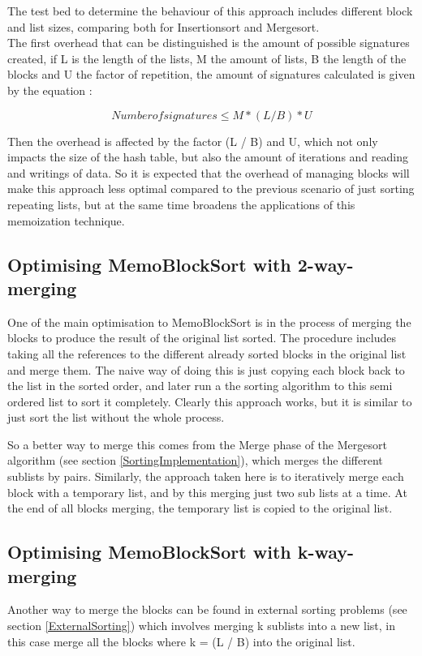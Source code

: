 \documentclass[a4paper,12pt]{article}
\begin{document}
The test bed to determine the behaviour of this approach includes different block and list sizes, comparing both for Insertionsort and Mergesort. \\

The first overhead that can be distinguished is the amount of possible signatures created, if L is the length of the lists, M the amount of lists, B the length of the blocks and U the factor of repetition, the amount of signatures calculated is given by the equation :

\begin{equation}
Number of signatures \leq  M * (L / B) * U
\end{equation}

Then the overhead is affected by the factor (L / B) and U, which not only impacts the size of the hash table, but also the amount of iterations and reading and writings of data. So it is expected that the overhead of managing blocks will make this approach less optimal compared to the previous scenario of just sorting repeating lists, but at the same time broadens the applications of this memoization technique.

\subsection{Optimising MemoBlockSort with 2-way-merging}
One of the main optimisation to MemoBlockSort is in the process of merging the blocks to produce the result of the original list sorted. The procedure includes taking all the references to the different already sorted blocks in the original list and merge them. The naive way of doing this is just copying each block back to the list in the sorted order, and later run a the sorting algorithm to this semi ordered list to sort it completely. Clearly this approach works, but it is similar to just sort the list without the whole process.

So a better way to merge this comes from the Merge phase of the Mergesort algorithm (see section \ref{SortingImplementation}), which merges the different sublists by pairs. Similarly, the approach taken here is to iteratively merge each block with a temporary list, and by this merging just two sub lists at a time. At the end of all blocks merging, the temporary list is copied to the original list.

\subsection{Optimising MemoBlockSort with k-way-merging}
Another way to merge the blocks can be found in external sorting problems (see section \ref{ExternalSorting}) which involves merging k sublists into a new list, in this case merge all the blocks where k =  (L / B) into the original list.\\
\end{document}
